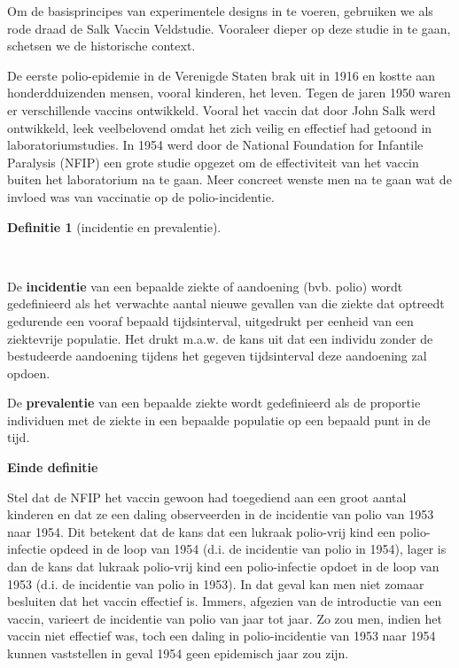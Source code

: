 \documentclass[
  dutch,
  letterpaper,
  12pt]{book}
\theoremstyle{definition}
\theoremstyle{definition}
\newtheorem{definition}{Definitie}[chapter]
\theoremstyle{definition}
\theoremstyle{remark}
\begin{document}
Om de basisprincipes van experimentele designs in te voeren, gebruiken
we als rode draad de Salk Vaccin Veldstudie. Vooraleer dieper op deze
studie in te gaan, schetsen we de historische context.

De eerste polio-epidemie in de Verenigde Staten brak uit in 1916 en
kostte aan honderdduizenden mensen, vooral kinderen, het leven. Tegen de
jaren 1950 waren er verschillende vaccins ontwikkeld. Vooral het vaccin
dat door John Salk werd ontwikkeld, leek veelbelovend omdat het zich
veilig en effectief had getoond in laboratoriumstudies. In 1954 werd
door de National Foundation for Infantile Paralysis (NFIP) een grote
studie opgezet om de effectiviteit van het vaccin buiten het
laboratorium na te gaan. Meer concreet wenste men na te gaan wat de
invloed was van vaccinatie op de polio-incidentie.

\begin{definition}[incidentie en
prevalentie]\protect\hypertarget{def-incidentie-en-prevalentie}{}\label{def-incidentie-en-prevalentie}

~

\end{definition}

De \textbf{incidentie} van een bepaalde ziekte of aandoening (bvb.
polio) wordt gedefinieerd als het verwachte aantal nieuwe gevallen van
die ziekte dat optreedt gedurende een vooraf bepaald tijdsinterval,
uitgedrukt per eenheid van een ziektevrije populatie. Het drukt m.a.w.
de kans uit dat een individu zonder de bestudeerde aandoening tijdens
het gegeven tijdsinterval deze aandoening zal opdoen.

De \textbf{prevalentie} van een bepaalde ziekte wordt gedefinieerd als
de proportie individuen met de ziekte in een bepaalde populatie op een
bepaald punt in de tijd.

\textbf{Einde definitie}

Stel dat de NFIP het vaccin gewoon had toegediend aan een groot aantal
kinderen en dat ze een daling observeerden in de incidentie van polio
van 1953 naar 1954. Dit betekent dat de kans dat een lukraak polio-vrij
kind een polio-infectie opdeed in de loop van 1954 (d.i. de incidentie
van polio in 1954), lager is dan de kans dat lukraak polio-vrij kind een
polio-infectie opdoet in de loop van 1953 (d.i. de incidentie van polio
in 1953). In dat geval kan men niet zomaar besluiten dat het vaccin
effectief is. Immers, afgezien van de introductie van een vaccin,
varieert de incidentie van polio van jaar tot jaar. Zo zou men, indien
het vaccin niet effectief was, toch een daling in polio-incidentie van
1953 naar 1954 kunnen vaststellen in geval 1954 geen epidemisch jaar zou
zijn.
\end{document}
